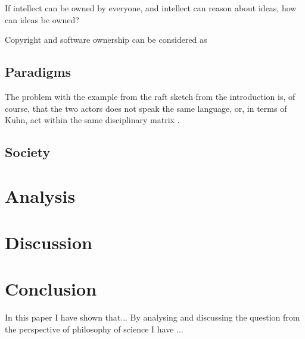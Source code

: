\documentclass{article}
\begin{document}
If intellect can be owned by everyone, and intellect can reason about ideas, how can ideas be owned? 

Copyright and software ownership can be considered as 

\subsection{Paradigms} \label{Theory:Paradigms}
The problem with the example from the raft sketch from the introduction is, of course, that the two actors does not speak the same language, or, in terms of Kuhn, act within the same disciplinary matrix \citep{Holm:2014}.


\subsection{Society}

\section{Analysis}

\section{Discussion}

\section{Conclusion}
In this paper I have shown that...
By analysing and discussing the question from the perspective
of philosophy of science I have ...


\end{document}
